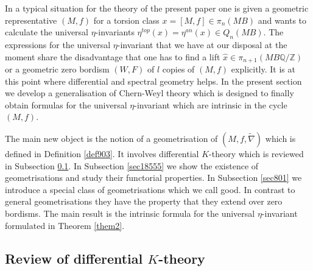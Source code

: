 \documentclass[12pt]{article}
\newcommand{\Z}{{\mathbb{Z}}}
\newcommand{\Q}{{\mathbb{Q}}}
\begin{document}
In a typical situation for the theory of the present paper one is given a geometric representative $(M,f)$ for a torsion class $x=[M,f]\in \pi_{n}(MB)$ and wants to calculate the universal $\eta$-invariants $\eta^{top}(x)=\eta^{an}(x)\in Q_{n}(MB)$. The expressions for the universal $\eta$-invariant  that we have at our disposal at the moment  share the disadvantage that one has to find a lift $\hat x\in \pi_{n+1}(MB\Q/\Z)$ or a geometric zero bordism $(W,F)$ of $l$ copies of $(M,f)$ explicitly.
It is at this point where differential and spectral geometry helps. 
In the present section we develop a generalisation of Chern-Weyl theory
 which is designed to finally obtain formulas for the universal $\eta$-invariant which are intrinsic in the cycle $(M,f)$.

The main new object is the notion of a geometrisation of $(M,f,\tilde \nabla)$ which is defined in Definition \ref{def903}. It  involves differential $K$-theory which is reviewed 
in Subsection \ref{subsec41}.  
In Subsection \ref{sec18555} we  show the existence of geometrisations and study their functorial properties.  
In Subsection \ref{sec801} we introduce a special class of geometrisations which we call good.
In contrast to general geometrisations they have the property that they extend over zero bordisms.
The main result 
is the intrinsic formula for the universal $\eta$-invariant formulated in Theorem \ref{them2}.

\subsection{Review of differential $K$-theory}\label{subsec41}
\end{document}
